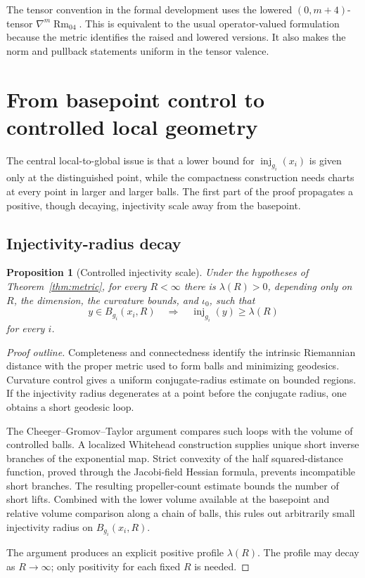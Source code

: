 \documentclass[11pt]{article}
\theoremstyle{plain}
\newtheorem{proposition}[theorem]{Proposition}
\theoremstyle{definition}
\theoremstyle{remark}
\newcommand{\Rm}{\operatorname{Rm}}
\newcommand{\inj}{\operatorname{inj}}
\begin{document}
The tensor convention in the formal development uses the lowered
\((0,m+4)\)-tensor \(\nabla^m\Rm_{04}\).  This is equivalent to the usual
operator-valued formulation because the metric identifies the raised and
lowered versions.  It also makes the norm and pullback statements uniform in
the tensor valence.

\section{From basepoint control to controlled local geometry}

The central local-to-global issue is that a lower bound for
\(\inj_{g_i}(x_i)\) is given only at the distinguished point, while the
compactness construction needs charts at every point in larger and larger
balls.  The first part of the proof propagates a positive, though decaying,
injectivity scale away from the basepoint.

\subsection{Injectivity-radius decay}

\begin{proposition}[Controlled injectivity scale]\label{prop:injdecay}
Under the hypotheses of Theorem~\ref{thm:metric}, for every \(R<\infty\)
there is \(\lambda(R)>0\), depending only on \(R\), the dimension, the
curvature bounds, and \(\iota_0\), such that
\[
  y\in B_{g_i}(x_i,R)
  \quad\Longrightarrow\quad
  \inj_{g_i}(y)\geq\lambda(R)
\]
for every \(i\).
\end{proposition}

\begin{proof}[Proof outline]
Completeness and connectedness identify the intrinsic Riemannian distance
with the proper metric used to form balls and minimizing geodesics.  Curvature
control gives a uniform conjugate-radius estimate on bounded regions.  If
the injectivity radius degenerates at a point before the conjugate radius,
one obtains a short geodesic loop.

The Cheeger--Gromov--Taylor argument compares such loops with the volume of
controlled balls.  A localized Whitehead construction supplies unique short
inverse branches of the exponential map.  Strict convexity of the half
squared-distance function, proved through the Jacobi-field Hessian formula,
prevents incompatible short branches.  The resulting propeller-count
estimate bounds the number of short lifts.  Combined with the lower volume
available at the basepoint and relative volume comparison along a chain of
balls, this rules out arbitrarily small injectivity radius on
\(B_{g_i}(x_i,R)\).

The argument produces an explicit positive profile \(\lambda(R)\).  The
profile may decay as \(R\to\infty\); only positivity for each fixed \(R\) is
needed.
\end{proof}
\end{document}
